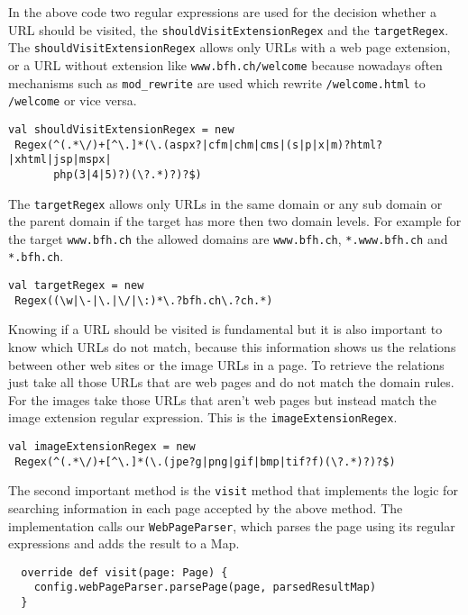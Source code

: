 \documentclass[
	a4paper,					10pt,							twoside,					openright,				notitlepage,			parskip=half,			]{scrreprt}
\begin{document}
In the above code two regular expressions are used for the decision whether a \gls{URL} should be visited, 
the \verb|shouldVisitExtensionRegex| and the \verb|targetRegex|.
The \verb|shouldVisitExtensionRegex| allows only \gls{URL}s with a web page extension, or a \gls{URL} without 
extension like \verb|www.bfh.ch/welcome| because nowadays often mechanisms such as \verb|mod_rewrite|
are used which rewrite \verb|/welcome.html| to \verb|/welcome| or vice versa.
\begin{lstlisting}[language={}]
val shouldVisitExtensionRegex = new
 Regex(^(.*\/)+[^\.]*(\.(aspx?|cfm|chm|cms|(s|p|x|m)?html?|xhtml|jsp|mspx|
       php(3|4|5)?)(\?.*)?)?$)
\end{lstlisting}
The \verb|targetRegex| allows only \gls{URL}s in the same domain or any sub domain or the parent domain 
if the target has more then two domain levels. For example for the target \verb|www.bfh.ch| the allowed 
domains are \verb|www.bfh.ch|, \verb|*.www.bfh.ch| and \verb|*.bfh.ch|.
\begin{lstlisting}[language={}]
val targetRegex = new
 Regex((\w|\-|\.|\/|\:)*\.?bfh.ch\.?ch.*)
\end{lstlisting}
Knowing if a \gls{URL} should be visited is fundamental but it is also important to know which URLs do not match, 
because this information shows us the relations between other web sites or the image \gls{URL}s in a page.
To retrieve the relations just take all those \gls{URL}s that are web pages and do not match the domain rules. 
For the images take those \gls{URL}s that aren't web pages but instead match the image extension regular expression.
This is the \verb|imageExtensionRegex|.
\begin{lstlisting}[language={}]
val imageExtensionRegex = new
 Regex(^(.*\/)+[^\.]*(\.(jpe?g|png|gif|bmp|tif?f)(\?.*)?)?$)
\end{lstlisting}

The second important method is the \verb|visit| method that implements the logic for searching information 
in each page accepted by the above method.
The implementation calls our \verb|WebPageParser|, which parses the page using its regular expressions and adds the result to a Map.
\begin{lstlisting}
  override def visit(page: Page) {
    config.webPageParser.parsePage(page, parsedResultMap)
  }
\end{lstlisting}
\end{document}
